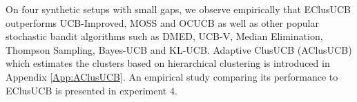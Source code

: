 On four synthetic setups with small gaps, we observe empirically that EClusUCB outperforms UCB-Improved\cite{auer2010ucb}, MOSS\cite{audibert2009minimax} and OCUCB\cite{lattimore2015optimally} as well as other popular stochastic bandit algorithms such as DMED\cite{honda2010asymptotically}, UCB-V\cite{audibert2009exploration}, Median Elimination\cite{even2006action}, Thompson Sampling\cite{agrawal2011analysis}, Bayes-UCB\cite{kaufmann2012bayesian} and KL-UCB\cite{garivier2011kl}. Adaptive ClusUCB (AClusUCB) which estimates the clusters based on hierarchical clustering is introduced in Appendix \ref{App:AClusUCB}. An empirical study comparing its performance to EClusUCB is presented in experiment $4$. 

